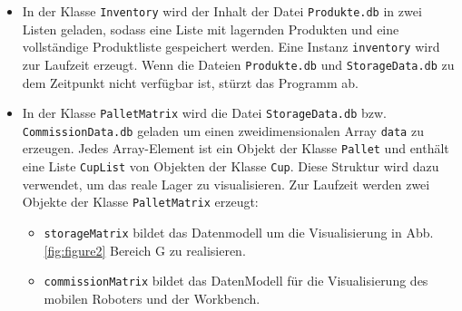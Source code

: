     \begin{itemize}
        \item In der Klasse \verb|Inventory| wird der Inhalt der Datei \verb|Produkte.db| in zwei Listen geladen, sodass
        eine Liste mit lagernden Produkten und eine vollständige Produktliste gespeichert werden.
        Eine Instanz \verb|inventory| wird zur Laufzeit erzeugt. Wenn die Dateien \verb|Produkte.db| und
        \verb|StorageData.db| zu dem Zeitpunkt nicht verfügbar ist, stürzt das Programm ab.
        \item In der Klasse \verb|PalletMatrix| wird die Datei \verb|StorageData.db| bzw. \verb|CommissionData.db|
        geladen um einen zweidimensionalen Array \verb|data| zu erzeugen.
        Jedes Array-Element ist ein Objekt der Klasse \verb|Pallet| und enthält eine Liste \verb|CupList| von Objekten
        der Klasse \verb|Cup|.
        Diese Struktur wird dazu verwendet, um das reale Lager zu visualisieren.
        Zur Laufzeit werden zwei Objekte der Klasse \verb|PalletMatrix| erzeugt:
        \begin{itemize}
            \item \verb|storageMatrix| bildet das Datenmodell um die Visualisierung in Abb.\ref{fig:figure2} Bereich \grqq G \glqq zu realisieren.
            \item \verb|commissionMatrix| bildet das DatenModell für die Visualisierung des mobilen Roboters und der
            Workbench.
        \end{itemize}
    \end{itemize}
\newpage

